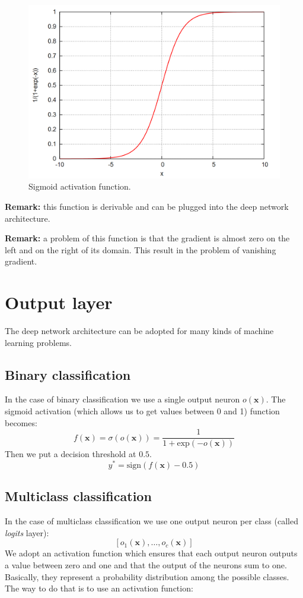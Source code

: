\begin{figure}[H]
	\centering
	\includegraphics[scale=0.2]{
        images/16_DeepLearning_sigmoid.png
    }
	\caption{Sigmoid activation function.}
	\label{fig:sigmoid}
\end{figure}

\textbf{Remark:} this function is derivable and can be plugged into the deep
network architecture.
\newline

\textbf{Remark:} a problem of this function is that the gradient is almost zero on
the left and on the right of its domain. This result in the problem of vanishing
gradient.
\newline

\section{Output layer}
The deep network architecture can be adopted for many kinds of machine learning
problems.
\newline

\subsection{Binary classification}
In the case of binary classification we use a single output neuron $o(\pmb{x})$.
The sigmoid activation (which allows us to get values between 0 and 1) function becomes:
\[
	f(\pmb{x}) = \sigma(o(\pmb{x})) = \frac{1}{1+\text{exp}(-o(\pmb{x}))}
\]
Then we put a decision threshold at $0.5$.
\[
	y^{*}= \text{sign}(f(\pmb{x}) - 0.5)
\]

\subsection{Multiclass classification}
In the case of multiclass classification we use one output neuron per class (called
\textit{logits} layer):
\[
	[o_{1}(\pmb{x}), \hdots, o_{c}(\pmb{x})]
\]
We adopt an activation function which ensures that each output neuron outputs a
value between zero and one and that the output of the neurons sum to one. Basically,
they represent a probability distribution among the possible classes. The way to
do that is to use an activation function:

